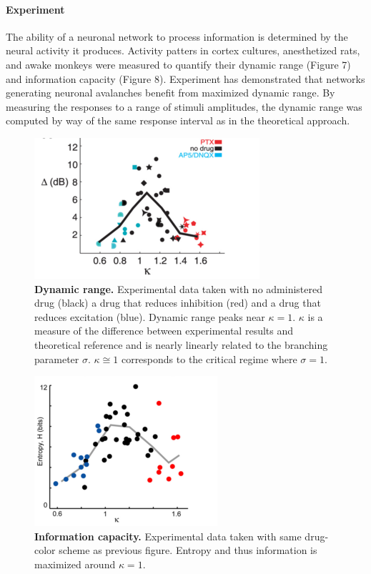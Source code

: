 \documentclass[12pt]{article}
\begin{document}
\paragraph{Experiment}
The ability of a neuronal network to process information is determined by the neural activity it produces. Activity patters in cortex cultures, anesthetized rats, and awake monkeys were measured to quantify their dynamic range (Figure 7) and information capacity (Figure 8). Experiment has demonstrated that networks generating neuronal avalanches benefit from maximized dynamic range\cite{Shew2009b}. By measuring the responses to a range of stimuli amplitudes, the dynamic range was computed by way of the same response interval as in the theoretical approach.

\begin{figure}      
  \begin{center}    
 \includegraphics[width=.5\textwidth]{dynamicrangeexpplenz}    
    \caption{\textbf{Dynamic range.} Experimental data taken with no administered drug (black) a drug that reduces inhibition (red) and a drug that reduces excitation (blue). Dynamic range peaks near $\kappa = 1$. $\kappa$ is a measure of the difference between experimental results and theoretical reference and is nearly linearly related to the branching parameter $\sigma$. $\kappa \cong 1$ corresponds to the critical regime where $\sigma = 1$. \cite{Shew2009b}}   
   \label{Figure::Dynamic Range Experiment}   
  \end{center}     
   \end{figure}
  
\begin{figure}      
  \begin{center}    
 \includegraphics[width=.40\textwidth]{entropyplenz}    
    \caption{\textbf{Information capacity.} Experimental data taken with same drug-color scheme as previous figure. Entropy and thus information is maximized around $\kappa = 1$. \cite{Shew2011a}}   
   \label{Figure::Entropy / information maximized experimental}   
  \end{center}     
   \end{figure}
   
\end{document}
